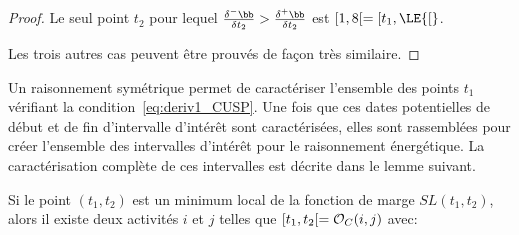 \begin{proof}
Le seul point $t_2$ pour lequel $ \frac{\delta^{-}\bb}{\delta t_2} >
\frac{\delta^{+}\bb}{\delta t_2}$ est $[1,8[= [t_1, \LE{[}$. 

Les trois autres cas peuvent être prouvés de façon très similaire. 
\end{proof}

Un raisonnement symétrique permet de caractériser l'ensemble des
points $t_1$ vérifiant la condition~\eqref{eq:deriv1_CUSP}. Une fois
que ces dates potentielles de début et de fin d'intervalle d'intérêt
sont caractérisées, elles sont rassemblées pour créer l'ensemble des
intervalles d'intérêt pour le raisonnement énergétique. 
La caractérisation complète de ces intervalles est décrite dans le
lemme suivant.

\begin{lemma}
  Si le point $(t_1,t_2)$ est un minimum local de la fonction de marge
$SL(t_1,t_2)$, alors il existe deux activités $i$ et $j$ telles que
$[t_1,t_2[ = {\cal O}_C(i,j)$ avec:
  

\end{lemma}
